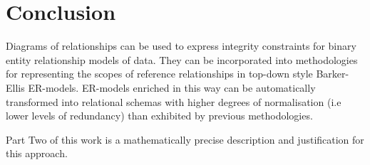 \documentclass[10pt,a4paper]{article}
\begin{document}


\section{Conclusion}
Diagrams of relationships can be used to express integrity constraints for binary entity relationship models of data. They can be incorporated into methodologies for representing the scopes of reference relationships in top-down style Barker-Ellis ER-models. ER-models enriched in this way can be automatically transformed into relational schemas with higher degrees of normalisation (i.e lower levels of redundancy) than exhibited by previous methodologies. 

\noindent Part Two of this work is a mathematically precise description and justification for this approach.

 

	 
\end{document}
